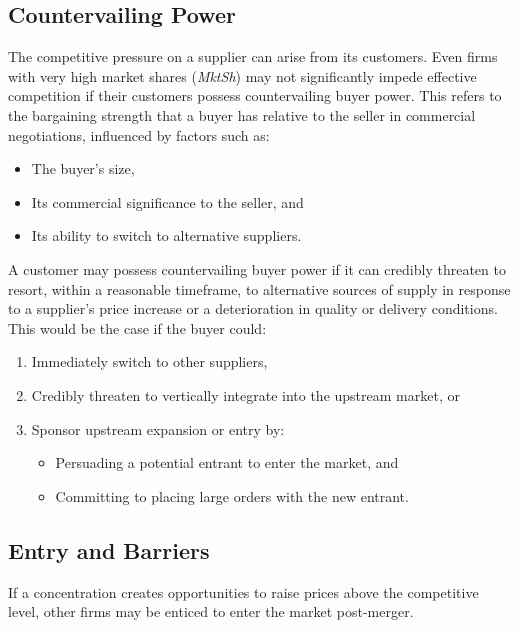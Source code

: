     \subsection{Countervailing Power}\label{CBP}

        The competitive pressure on a supplier can arise from its customers. Even firms with very high market shares (\textit{MktSh}) may not significantly impede effective competition if their customers possess countervailing buyer power. This refers to the bargaining strength that a buyer has relative to the seller in commercial negotiations, influenced by factors such as:

        \begin{itemize}
            \item The buyer's size,
            \item Its commercial significance to the seller, and
            \item Its ability to switch to alternative suppliers.
        \end{itemize}
        
        A customer may possess countervailing buyer power if it can credibly threaten to resort, within a reasonable timeframe, to alternative sources of supply in response to a supplier's price increase or a deterioration in quality or delivery conditions. This would be the case if the buyer could:
        
        \begin{enumerate}
            \item Immediately switch to other suppliers,
            \item Credibly threaten to vertically integrate into the upstream market, or
            \item Sponsor upstream expansion or entry by:
            \begin{itemize}
                \item Persuading a potential entrant to enter the market, and
                \item Committing to placing large orders with the new entrant.
            \end{itemize}
        \end{enumerate}

    \subsection{Entry and Barriers}\label{PC}

        If a concentration creates opportunities to raise prices above the competitive level, other firms may be enticed to enter the market post-merger.

